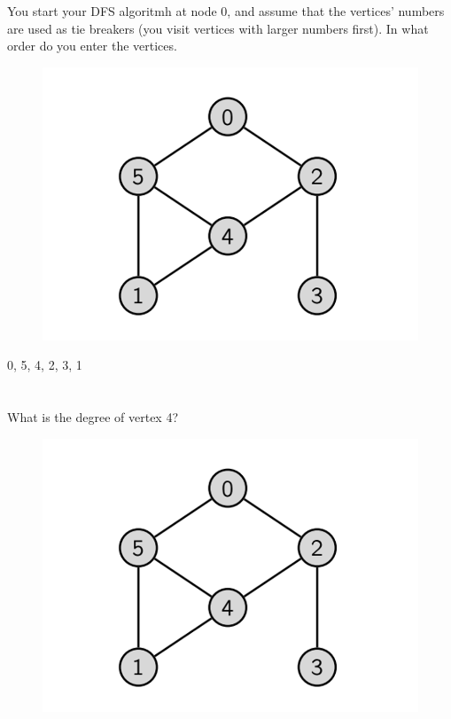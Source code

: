 \documentclass [12pt]{article}
\begin{document}
\section{} You start your DFS algoritmh at node 0, and assume that the vertices' numbers are used as tie breakers (you visit vertices with larger numbers first). In what order do you enter the vertices. 
\begin{figure}[H]
    \centering
    \includegraphics[scale=0.5]{1.png} 
    \label{fig:my_label}
\end{figure}

\begin{Solution}
0, 5, 4, 2, 3, 1
\end{Solution}


\section{} What is the degree of vertex 4?
\begin{figure}[H]
    \centering
    \includegraphics[scale=0.5]{1.png} 
    \label{fig:my_label}
\end{figure}
\end{document}
